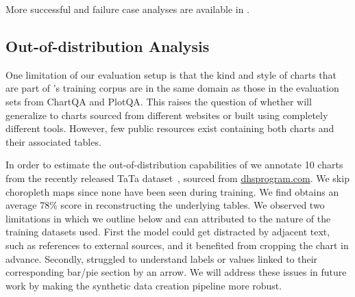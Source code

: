 More successful and failure case analyses are available in .

\subsection{Out-of-distribution Analysis}\label{sec:ood}

One limitation of our evaluation setup is that the kind and style of charts that are part of \model{}'s training corpus are in the same domain as those in the evaluation sets from ChartQA and PlotQA.
This raises the question of whether \model{} will generalize to charts sourced from different websites or built using completely different tools.
However, few public resources exist containing both charts and their associated tables. 

In order to estimate the out-of-distribution capabilities of \model{} we annotate 10 charts from the recently released TaTa dataset~\cite{gehrmann2022tata}, sourced from \url{dhsprogram.com}. We skip choropleth maps since none have been seen during training. We find \model{} obtains an average 78\%  score in reconstructing the underlying tables. 
We observed two limitations in \model{} which we outline below and can attributed to the nature of the training datasets used. 
First the model could get distracted by adjacent text, such as references to external sources, and it benefited from cropping the chart in advance.
Secondly, \model{} struggled to understand labels or values linked to their corresponding bar/pie section by an arrow.
We will address these issues in future work by making the synthetic data creation pipeline more robust.